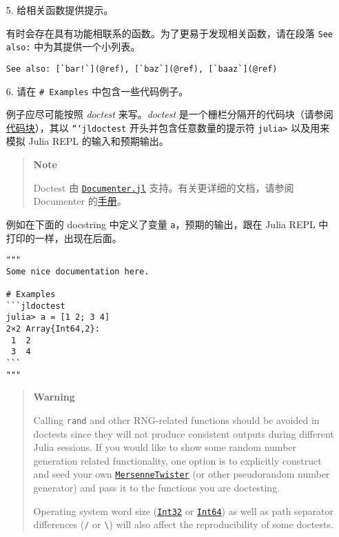 \begin{itemize}
\item[5.  ] 给相关函数提供提示。

有时会存在具有功能相联系的函数。为了更易于发现相关函数，请在段落 \texttt{See also:} 中为其提供一个小列表。


\begin{lstlisting}
See also: [`bar!`](@ref), [`baz`](@ref), [`baaz`](@ref)
\end{lstlisting}


\item[6.  ] 请在 \texttt{\# Examples} 中包含一些代码例子。

例子应尽可能按照 \emph{doctest} 来写。\emph{doctest} 是一个栅栏分隔开的代码块（请参阅\href{@ref}{代码块}），其以 \texttt{```jldoctest} 开头并包含任意数量的提示符 \texttt{julia>} 以及用来模拟 Julia REPL 的输入和预期输出。

\begin{quote}
\textbf{Note}

Doctest 由 \href{https://github.com/JuliaDocs/Documenter.jl}{\texttt{Documenter.jl}} 支持。有关更详细的文档，请参阅 Documenter 的\href{https://juliadocs.github.io/Documenter.jl/}{手册}。

\end{quote}
例如在下面的 docstring 中定义了变量 \texttt{a}，预期的输出，跟在 Julia REPL 中打印的一样，出现在后面。


\begin{verbatim}
"""
Some nice documentation here.

# Examples
```jldoctest
julia> a = [1 2; 3 4]
2×2 Array{Int64,2}:
 1  2
 3  4
```
"""
\end{verbatim}

\begin{quote}
\textbf{Warning}

Calling \texttt{rand} and other RNG-related functions should be avoided in doctests since they will not produce consistent outputs during different Julia sessions. If you would like to show some random number generation related functionality, one option is to explicitly construct and seed your own \hyperlink{4960058165975837552}{\texttt{MersenneTwister}} (or other pseudorandom number generator) and pass it to the functions you are doctesting.

Operating system word size (\hyperlink{10103694114785108551}{\texttt{Int32}} or \hyperlink{7720564657383125058}{\texttt{Int64}}) as well as path separator differences (\texttt{/} or \texttt{{\textbackslash}}) will also affect the reproducibility of some doctests.


\end{quote}
\end{itemize}
